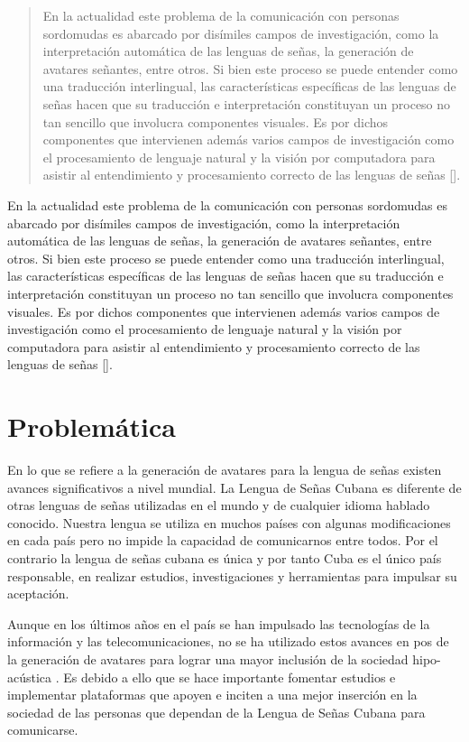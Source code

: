 \begin{quotation}

En la actualidad este problema de la comunicación con personas sordomudas es abarcado por disímiles campos de investigación, como la interpretación automática de las lenguas de señas, la generación de avatares señantes, entre otros. Si bien este proceso se puede entender como una traducción interlingual, las características  específicas de las lenguas de señas hacen que su traducción e interpretación constituyan un proceso no tan sencillo que involucra componentes visuales. Es por dichos componentes que intervienen además varios campos de investigación como el procesamiento de lenguaje natural y la visión por computadora para asistir al entendimiento y procesamiento correcto de las lenguas de señas [\cite{leynier-lsc-2021}].

\end{quotation}
En la actualidad este problema de la comunicación con personas sordomudas es abarcado por disímiles campos de investigación, como la interpretación automática de las lenguas de señas, la generación de avatares señantes, entre otros. Si bien este proceso se puede entender como una traducción interlingual, las características  específicas de las lenguas de señas hacen que su traducción e interpretación constituyan un proceso no tan sencillo que involucra componentes visuales. Es por dichos componentes que intervienen además varios campos de investigación como el procesamiento de lenguaje natural y la visión por computadora para asistir al entendimiento y procesamiento correcto de las lenguas de señas [\cite{leynier-lsc-2021}].

\section{Problemática}

En lo que se refiere a la generación de avatares para la lengua de señas existen avances 
significativos a nivel mundial. La Lengua de Señas Cubana es diferente de otras lenguas
de señas utilizadas en el mundo y de cualquier idioma hablado conocido. Nuestra lengua se 
utiliza en muchos países con algunas modificaciones en cada país pero no impide la capacidad de comunicarnos entre todos. Por el contrario la lengua de señas cubana es única y por tanto Cuba es el único país responsable, en realizar estudios, investigaciones y herramientas para 
impulsar su aceptación.

Aunque en los últimos años en el país se han impulsado las tecnologías de la información y las 
telecomunicaciones, no se ha utilizado estos avances en pos de la generación de avatares para lograr 
una mayor inclusión de la sociedad hipo-acústica . Es debido a ello que se hace importante
fomentar estudios e implementar plataformas que apoyen e inciten a una mejor inserción
en la sociedad de las personas que dependan de la Lengua de Señas Cubana para
comunicarse.

